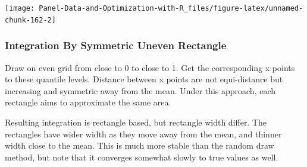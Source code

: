 \documentclass[
]{book}
\begin{document}
\begin{center}\texttt{[image: Panel-Data-and-Optimization-with-R\_files/figure-latex/unnamed-chunk-162-2]} \end{center}

\hypertarget{integration-by-symmetric-uneven-rectangle}{%
\subsubsection{Integration By Symmetric Uneven Rectangle}\label{integration-by-symmetric-uneven-rectangle}}

Draw on even grid from close to 0 to close to 1. Get the corresponding x points to these quantile levels. Distance between x points are not equi-distance but increasing and symmetric away from the mean. Under this approach, each rectangle aims to approximate the same area.

Resulting integration is rectangle based, but rectangle width differ. The rectangles have wider width as they move away from the mean, and thinner width close to the mean. This is much more stable than the random draw method, but note that it converges somewhat slowly to true values as well.
\end{document}
